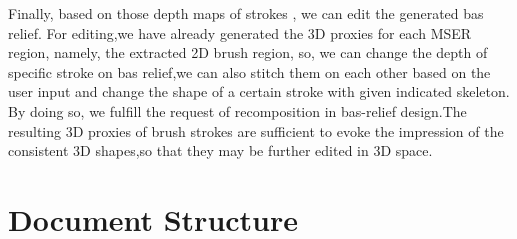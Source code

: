 Finally, based on those depth maps of strokes , we can edit the generated bas relief. For editing,we have already generated the 3D proxies for each MSER region, namely, the extracted 2D brush region, so, we can change the depth of specific stroke on bas relief,we can also stitch them on each other based on the user input and change the shape of a certain stroke with given indicated skeleton. By doing so, we fulfill the request of recomposition in bas-relief design.The resulting 3D proxies of brush strokes are sufficient to evoke the impression of the consistent 3D shapes,so that they may be further edited in 3D space. 



\section{Document Structure}


\newpage